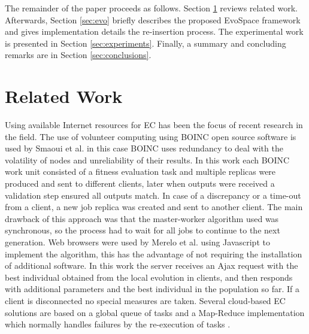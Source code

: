 \documentclass{llncs}
\begin{document}
The remainder of the paper proceeds as follows. Section \ref{sec:work} 
reviews related work. Afterwards, Section \ref{sec:evo} briefly describes the
proposed EvoSpace framework and gives implementation details the re-insertion
process. The experimental work is presented in Section \ref{sec:experiments}.
Finally, a summary and concluding remarks are in Section \ref{sec:conclusions}.

\section{Related Work}
\label{sec:work}
Using available Internet resources for EC has been the focus of recent research
in the field. The use of volunteer computing using BOINC open source software 
is used by Smaoui et al.  \cite{FekiNG09} in this case BOINC uses redundancy
to deal with the volatility of nodes and unreliability of their results. 
In this work each BOINC work unit consisted of a fitness evaluation task and
multiple replicas were produced and sent to different clients, later when 
outputs were received a validation step ensured all outputs match. In case of
a discrepancy or a time-out from a client, a new job replica was created and
sent to another client. The main drawback of this approach was that the 
master-worker algorithm used was synchronous, so the process had to wait 
for all jobs to continue to the next generation. Web browsers were used by 
Merelo et al. \cite{JSON} using Javascript to implement the algorithm, this has the 
advantage of not requiring the installation of additional software. 
In this work the server receives an Ajax request with the best individual 
obtained from the local evolution in clients, and then responds with 
additional parameters and the best individual in the population so far. 
If a client is disconnected no special measures are taken. Several cloud-based
EC solutions are based on a  global queue of tasks and a Map-Reduce 
implementation which normally handles failures by the re-execution of 
tasks \cite{fazenda2012,di2013towards,FlexGP}. 

\end{document}
